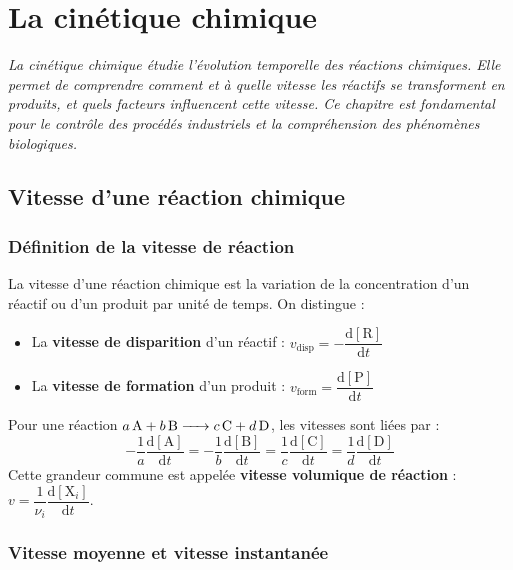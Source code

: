 \chapter{La cinétique chimique}

\textit{La cinétique chimique étudie l'évolution temporelle des réactions chimiques. Elle permet de comprendre comment et à quelle vitesse les réactifs se transforment en produits, et quels facteurs influencent cette vitesse. Ce chapitre est fondamental pour le contrôle des procédés industriels et la compréhension des phénomènes biologiques.}

\section{Vitesse d'une réaction chimique}

\subsection{Définition de la vitesse de réaction}

\begin{definition}
La vitesse d'une réaction chimique est la variation de la concentration d'un réactif ou d'un produit par unité de temps. On distingue :
\begin{itemize}
\item La \textbf{vitesse de disparition} d'un réactif : $v_{\text{disp}} = -\dfrac{\mathrm{d}[\mathrm{R}]}{\mathrm{d}t}$
\item La \textbf{vitesse de formation} d'un produit : $v_{\text{form}} = \dfrac{\mathrm{d}[\mathrm{P}]}{\mathrm{d}t}$
\end{itemize}
\end{definition}

\begin{propriete}
Pour une réaction $\ce{a A + b B -> c C + d D}$, les vitesses sont liées par :
\[
-\frac{1}{a}\frac{\mathrm{d}[\mathrm{A}]}{\mathrm{d}t} = -\frac{1}{b}\frac{\mathrm{d}[\mathrm{B}]}{\mathrm{d}t} = \frac{1}{c}\frac{\mathrm{d}[\mathrm{C}]}{\mathrm{d}t} = \frac{1}{d}\frac{\mathrm{d}[\mathrm{D}]}{\mathrm{d}t}
\]
Cette grandeur commune est appelée \textbf{vitesse volumique de réaction} : $v = \dfrac{1}{\nu_i}\dfrac{\mathrm{d}[\mathrm{X}_i]}{\mathrm{d}t}$.
\end{propriete}

\subsection{Vitesse moyenne et vitesse instantanée}

